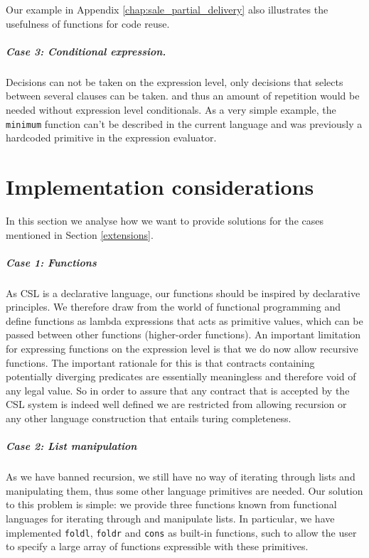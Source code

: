 \documentclass[10pt,a4paper,final,oneside,openany,article]{memoir}
\begin{document}
Our example in Appendix \ref{chap:sale_partial_delivery} also
illustrates the usefulness of functions for code reuse.

\paragraph{Case 3: Conditional expression.} Decisions can not be taken
on the expression level, only decisions that selects between several
clauses can be taken. and thus an amount of repetition would be needed
without expression level conditionals. As a very simple example, the
\lstinline{minimum} function can't be described in the current language
and was previously a hardcoded primitive in the expression evaluator.

\chapter{Implementation considerations}
In this section we analyse how we want to provide solutions for the
cases mentioned in Section \ref{extensions}.

\paragraph{Case 1: Functions} As CSL is a declarative language, our
functions should be inspired by declarative principles. We therefore
draw from the world of functional programming and define functions as
lambda expressions that acts as primitive values, which can be passed
between other functions (higher-order functions). An important
limitation for expressing functions on the expression level is that we
do now allow recursive functions. The important rationale for this is
that contracts containing potentially diverging predicates are
essentially meaningless and therefore void of any legal value. So in
order to assure that any contract that is accepted by the CSL system
is indeed well defined we are restricted from allowing recursion or
any other language construction that entails turing completeness.


\paragraph{Case 2: List manipulation}
As we have banned recursion, we still have no way of iterating through
lists and manipulating them, thus some other language primitives are
needed. Our solution to this problem is simple: we provide three
functions known from functional languages for iterating through and
manipulate lists. In particular, we have implemented \lstinline{foldl},
\lstinline{foldr} and \lstinline{cons} as built-in functions, such to
allow the user to specify a large array of functions expressible with
these primitives.
\end{document}
